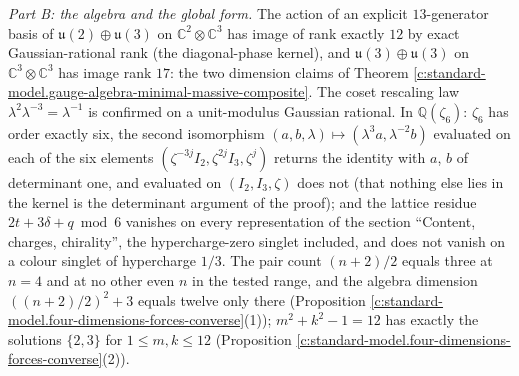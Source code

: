 \documentclass[11pt]{article}
\theoremstyle{definition}
\theoremstyle{plain}
\providecommand{\C}{}\renewcommand{\C}{\mathbb{C}}
\providecommand{\uu}{}\renewcommand{\uu}{\mathfrak{u}}
\begin{document}
\emph{Part B: the algebra and the global form.} The action of an explicit $13$-generator basis of $\uu(2) \oplus \uu(3)$ on $\C^{2} \otimes \C^{3}$ has image of rank exactly $12$ by exact Gaussian-rational rank (the diagonal-phase kernel), and $\uu(3) \oplus \uu(3)$ on $\C^{3} \otimes \C^{3}$ has image rank $17$: the two dimension claims of Theorem \ref{c:standard-model.gauge-algebra-minimal-massive-composite}. The coset rescaling law $\lambda^{2}\lambda^{-3} = \lambda^{-1}$ is confirmed on a unit-modulus Gaussian rational. In $\mathbb{Q}(\zeta_{6})$: $\zeta_{6}$ has order exactly six, the second isomorphism $(a, b, \lambda) \mapsto (\lambda^{3}a, \lambda^{-2}b)$ evaluated on each of the six elements $(\zeta^{-3j}I_{2}, \zeta^{2j}I_{3}, \zeta^{j})$ returns the identity with $a$, $b$ of determinant one, and evaluated on $(I_{2}, I_{3}, \zeta)$ does not (that nothing else lies in the kernel is the determinant argument of the proof); and the lattice residue $2t + 3\delta + q \bmod 6$ vanishes on every representation of the section ``Content, charges, chirality'', the hypercharge-zero singlet included, and does not vanish on a colour singlet of hypercharge $1/3$. The pair count $(n+2)/2$ equals three at $n = 4$ and at no other even $n$ in the tested range, and the algebra dimension $((n+2)/2)^{2} + 3$ equals twelve only there (Proposition \ref{c:standard-model.four-dimensions-forces-converse}(1)); $m^{2} + k^{2} - 1 = 12$ has exactly the solutions $\{2, 3\}$ for $1 \le m, k \le 12$ (Proposition \ref{c:standard-model.four-dimensions-forces-converse}(2)).
\end{document}
